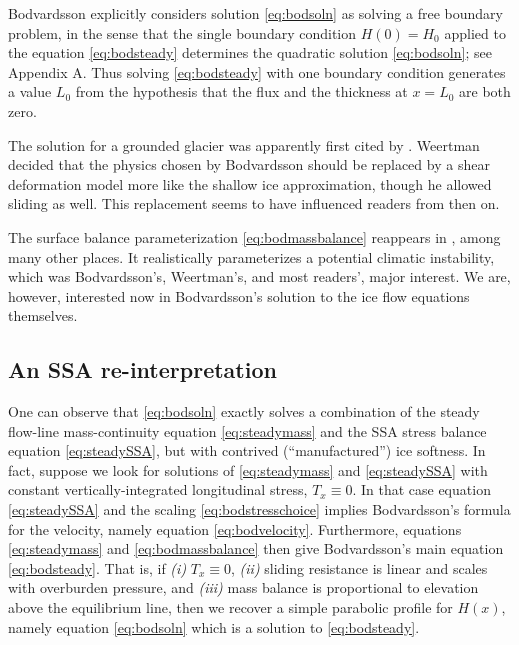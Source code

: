 \documentclass[review,letterpaper]{igs}
\begin{document}
Bodvardsson explicitly considers solution \eqref{eq:bodsoln} as solving a free boundary problem, in the sense that the single boundary condition $H(0)=H_0$ applied to the equation \eqref{eq:bodsteady} determines the quadratic solution \eqref{eq:bodsoln}; see Appendix A.  Thus solving \eqref{eq:bodsteady} with one boundary condition generates a value $L_0$ from the hypothesis that the flux and the thickness at $x=L_0$ are both zero.

The \cite{Bodvardsson} solution for a grounded glacier was apparently first cited by \cite{Weertman61stability}.  Weertman decided that the physics chosen by Bodvardsson should be replaced by a shear deformation model more like the shallow ice approximation, though he allowed sliding as well.  This replacement seems to have influenced readers from then on.

The surface balance parameterization \eqref{eq:bodmassbalance} reappears in \cite{Weertman61stability}, among many other places.  It realistically parameterizes a potential climatic instability, which was Bodvardsson's, Weertman's, and most readers', major interest.  We are, however, interested now in Bodvardsson's solution to the ice flow equations themselves.


\subsection*{An SSA re-interpretation}  One can observe that \eqref{eq:bodsoln} exactly solves a combination of the steady flow-line mass-continuity equation \eqref{eq:steadymass} and the SSA stress balance equation \eqref{eq:steadySSA}, but with contrived (``manufactured'') ice softness.  In fact, suppose we look for solutions of \eqref{eq:steadymass} and \eqref{eq:steadySSA} with constant vertically-integrated longitudinal stress, $T_x \equiv 0$.  In that case equation \eqref{eq:steadySSA} and the scaling \eqref{eq:bodstresschoice} implies Bodvardsson's formula for the velocity, namely equation \eqref{eq:bodvelocity}.  Furthermore, equations \eqref{eq:steadymass} and \eqref{eq:bodmassbalance} then give Bodvardsson's main equation \eqref{eq:bodsteady}.  That is, if \emph{(i)} $T_x \equiv 0$, \emph{(ii)} sliding resistance is linear and scales with overburden pressure, and \emph{(iii)} mass balance is proportional to elevation above the equilibrium line, then we recover a simple parabolic profile for $H(x)$, namely equation \eqref{eq:bodsoln} which is a solution to \eqref{eq:bodsteady}.
\end{document}
